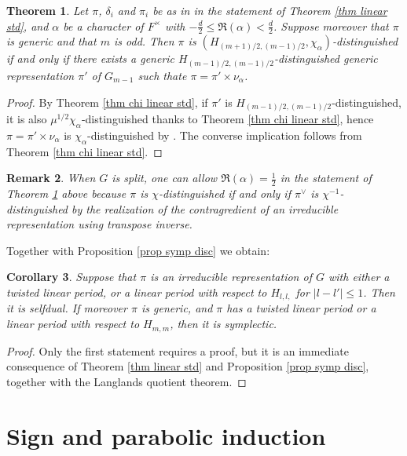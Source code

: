 \documentclass[11pt,letterpaper]{amsart}
\newcommand{\re}{\mathfrak{R}}
\def\d{\delta}
\theoremstyle{plain}
\newtheorem{thm}{Theorem}[section] \newtheorem{cor}[thm]{Corollary}
\newtheorem {rem}[thm]{Remark} \newtheorem{ex}[thm]{Example}
\numberwithin{equation}{section}
\begin{document}
\begin{thm}\label{thm chi linear gen}
Let $\pi$, $\d_i$ and $\pi_i$ be as in in the statement of Theorem \ref{thm linear std}, and $\alpha$ be a character of $F^\times$ with $-\frac{d}{2}\leq \re(\alpha)< \frac{d}{2}$. Suppose moreover that $\pi$ is generic and that $m$ is odd. Then $\pi$ is $(H_{(m+1)/2,(m-1)/2},\chi_{\alpha})$-distinguished if and only if there exists a generic $H_{(m-1)/2,(m-1)/2}$-distinguished generic representation $\pi'$ of $G_{m-1}$ such thate $\pi=\pi'\times \nu_{\alpha}$.
\end{thm}
\begin{proof}
By Theorem \ref{thm chi linear std}, if $\pi'$ is $H_{(m-1)/2,(m-1)/2}$-distinguished, it is also $\mu^{1/2}\chi_{\alpha}$-distinguished thanks to Theorem \ref{thm chi linear std}, hence $\pi=\pi'\times \nu_{\alpha}$ is $\chi_{\alpha}$-distinguished by 
\cite[Proposition 3.8]{MatCRELLE}. The converse implication follows from Theorem \ref{thm chi linear std}.
\end{proof}
\begin{rem}
When $G$ is split, one can allow $\re(\alpha)=\frac{1}{2}$ in the statement of Theorem \ref{thm chi linear gen} above because $\pi$ is $\chi$-distinguished if and only if $\pi^\vee$ is $\chi^{-1}$-distinguished by the realization of the contragredient of an irreducible representation using transpose inverse. 
\end{rem}


Together with Proposition \ref{prop symp disc} we obtain:

\begin{cor}\label{cor symp gen}
Suppose that $\pi$ is an irreducible representation of $G$ with either a twisted linear period, or a linear period with respect to 
$H_{l,l,}$ for $|l-l'|\leq 1$. Then it is selfdual. If moreover $\pi$ is generic, and $\pi$ has a twisted linear period or a linear period with respect to $H_{m,m}$, then it is symplectic. 
\end{cor}
\begin{proof}
Only the first statement requires a proof, but it is an immediate consequence of Theorem \ref{thm linear std} and Proposition \ref{prop symp disc}, together with the Langlands quotient theorem.
\end{proof}

\section{Sign and parabolic induction}\label{sec sign and induction}
\end{document}
